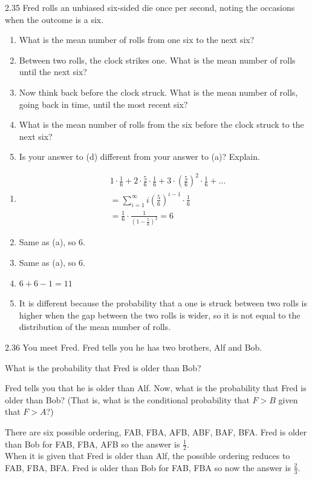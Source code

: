 \documentclass[12pt, a4paper]{article}
\begin{document}
\begin{prob}{2.35}
    Fred rolls an unbiased six-sided die once per second, noting the occasions when the outcome is a six.
    \begin{enumerate}
        \item[(a)] What is the mean number of rolls from one six to the next six?
        \item[(b)] Between two rolls, the clock strikes one. What is the mean number of rolls until the next six?
        \item[(c)] Now think back before the clock struck. What is the mean number of rolls, going back in time, until the most recent six?
        \item[(d)] What is the mean number of rolls from the six before the clock struck to the next six?
        \item[(e)] Is your answer to (d) different from your answer to (a)? Explain.
    \end{enumerate}
\end{prob}
\begin{sol}
    \begin{enumerate}
        \item[(a)] \begin{align*}
        &1 \cdot \frac{1}{6} + 2 \cdot \frac{5}{6} \cdot \frac{1}{6} + 3 \cdot (\frac{5}{6})^2 \cdot \frac{1}{6} + \dots \\
        &= \sum_{i=1}^{\infty} i (\frac{5}{6})^{i-1} \cdot \frac{1}{6} \\
        &= \frac{1}{6} \cdot \frac{1}{(1-\frac{5}{6})^2} = 6 
        \end{align*}
        \item[(b)] Same as (a), so 6.
        \item[(c)] Same as (a), so 6. 
        \item[(d)] $6 + 6 - 1 = 11$
        \item[(e)] It is different because the probability that a one is struck between two rolls is higher when the gap between the two rolls is wider, so it is not equal to the distribution of the mean number of rolls.
    \end{enumerate}
\end{sol}
\bigskip

\begin{prob}{2.36}
    You meet Fred. Fred tells you he has two brothers, Alf and Bob.
    
    What is the probability that Fred is older than Bob?
    
    Fred tells you that he is older than Alf. Now, what is the probability that Fred is older than Bob? (That is, what is the conditional probability that $F > B$ given that $F > A$?)
\end{prob}
\begin{sol}
    There are six possible ordering, FAB, FBA, AFB, ABF, BAF, BFA. Fred is older than Bob for FAB, FBA, AFB so the answer is $\frac{1}{2}$. \\
    When it is given that Fred is older than Alf, the possible ordering reduces to FAB, FBA, BFA. Fred is older than Bob for FAB, FBA so now the answer is $\frac{2}{3}$.
\end{sol}
\bigskip
\end{document}

